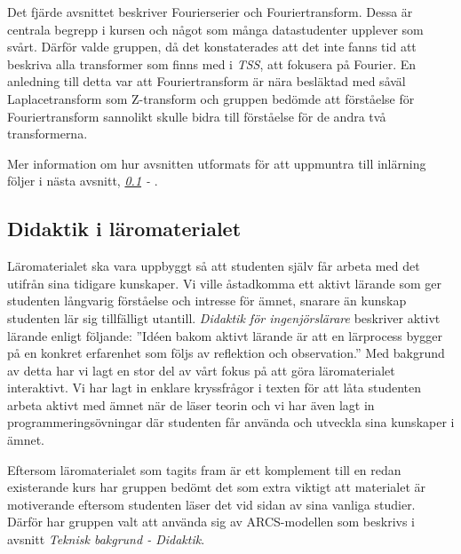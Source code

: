 \documentclass[12pt,a4paper,twoside,openright]{article}
\begin{document}
Det fjärde avsnittet beskriver Fourierserier och
Fouriertransform. Dessa är centrala begrepp i kursen och något som
många datastudenter upplever som svårt. Därför valde gruppen, då det
konstaterades att det inte fanns tid att beskriva alla transformer som
finns med i \textit{TSS}, att fokusera på Fourier. En anledning till
detta var att Fouriertransform är nära besläktad med såväl
Laplacetransform som Z-transform och gruppen bedömde att
förståelse för Fouriertransform sannolikt skulle bidra till
förståelse för de andra två transformerna.

Mer information om hur avsnitten utformats för att uppmuntra till
inlärning följer i nästa avsnitt, \textit{\ref{sec:matDidaktik} - }.

\subsection{Didaktik i läromaterialet}
\label{sec:matDidaktik}
Läromaterialet ska vara uppbyggt så att studenten själv får arbeta med
det utifrån sina tidigare kunskaper. Vi ville åstadkomma ett aktivt
lärande som ger studenten långvarig förståelse och intresse för ämnet,
snarare än kunskap studenten lär sig tillfälligt
utantill. \textit{Didaktik för ingenjörslärare}\cite{didaktik_for_ingenjorslarare} beskriver aktivt
lärande enligt följande: ”Idéen bakom aktivt lärande är att en
lärprocess bygger på en konkret erfarenhet som följs av reflektion och
observation.” Med bakgrund av detta har vi lagt en stor del av vårt
fokus på att göra läromaterialet interaktivt. Vi har lagt in enklare
kryssfrågor i texten för att låta studenten arbeta aktivt med ämnet
när de läser teorin och vi har även lagt in programmeringsövningar där
studenten får använda och utveckla sina kunskaper i ämnet.

Eftersom läromaterialet som tagits fram är ett komplement till en
redan existerande kurs har gruppen bedömt det som extra viktigt att
materialet är motiverande eftersom studenten läser det vid sidan av
sina vanliga studier. Därför har gruppen valt att använda sig av
ARCS-modellen som beskrivs i avsnitt \textit{Teknisk bakgrund -
 Didaktik}.
\end{document}

